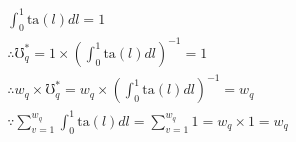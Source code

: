 \documentclass[hidelinks, nonatbib]{elsarticle}
\begin{document}
\begin{enumerate}
        \begin{align}
            \int_{0}^{1}{
                \text{ta}(l)dl
            }
            =
            1
            \\
            \therefore
            \mho_{q}^{*}
            =
            1 \times \left(
                \int_{0}^{1}{
                    \text{ta}(l)dl
                }
            \right) ^ {-1}
            =
            1
            \\
            \therefore
            w_q \times
            \mho_{q}^{*}
            =
            w_q \times \left(
                \int_{0}^{1}{
                    \text{ta}(l)dl
                }
            \right) ^ {-1}
            =
            w_q
            \\
            \because
            \sum_{v=1}^{w_q}
            \int_{0}^{1}{
                    \text{ta}(l)dl
                }
            =
            \sum_{v=1}^{w_q}
            1
            = 
            w_q \times 1
            = 
            w_q
        \end{align}


\end{enumerate}
\end{document}
